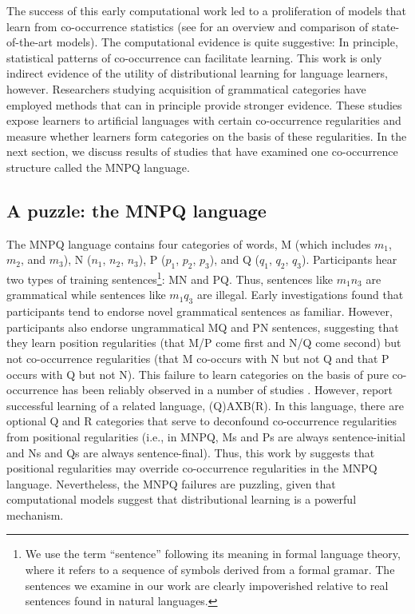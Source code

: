 \documentclass[man,longtable, floatmark]{my-apa6}
\begin{document}
The success of this early computational work led to a proliferation of models that learn from co-occurrence statistics (see \citealp{riordan2010} for an overview and comparison of state-of-the-art models). The computational evidence is quite suggestive: In principle, statistical patterns of co-occurrence can facilitate learning. This work is only indirect evidence of the utility of distributional learning for language learners, however. Researchers studying acquisition of grammatical categories have employed methods that can in principle provide stronger evidence. These studies expose learners to artificial languages with certain co-occurrence regularities and measure whether learners form categories on the basis of these regularities. In the next section, we discuss results of studies that have examined one co-occurrence structure called the MNPQ language.

\subsection{A puzzle: the MNPQ language}

The MNPQ language contains four categories of words, M (which includes $m_1$, $m_2$, and $m_3$), N ($n_1$, $n_2$, $n_3$), P ($p_1$, $p_2$, $p_3$), and Q ($q_1$, $q_2$, $q_3$). Participants hear two types of training sentences\footnote{ We use the term ``sentence'' following its meaning in formal language theory, where it refers to a sequence of symbols derived from a formal gramar. The sentences we examine in our work are clearly impoverished relative to real sentences found in natural languages.}: MN and PQ. Thus, sentences like $m_1 n_3$ are grammatical while sentences like $m_1 q_3$ are illegal. Early investigations \citep{braine1966, smith1966} found that participants tend to endorse novel grammatical sentences as familiar. However, participants also endorse ungrammatical MQ and PN sentences, suggesting that they learn position regularities (that M/P come first and N/Q come second) but not co-occurrence regularities (that M co-occurs with N but not Q and that P occurs with Q but not N). This failure to learn categories on the basis of pure co-occurrence has been reliably observed in a number of studies \citep{braine1987, brooks1993, frigo1998, kempe2001, gerken2005, lany2010, frank2011}. However, \citet[Experiment 5]{reeder2009} report successful learning of a related language, (Q)AXB(R). In this language, there are optional Q and R categories that serve to deconfound co-occurrence regularities from positional regularities (i.e., in MNPQ, Ms and Ps are always sentence-initial and Ns and Qs are always sentence-final). Thus, this work by \citeauthor{reeder2009} suggests that positional regularities may override co-occurrence regularities in the MNPQ language. Nevertheless, the MNPQ failures are puzzling, given that computational models suggest that distributional learning is a powerful mechanism.
\end{document}
